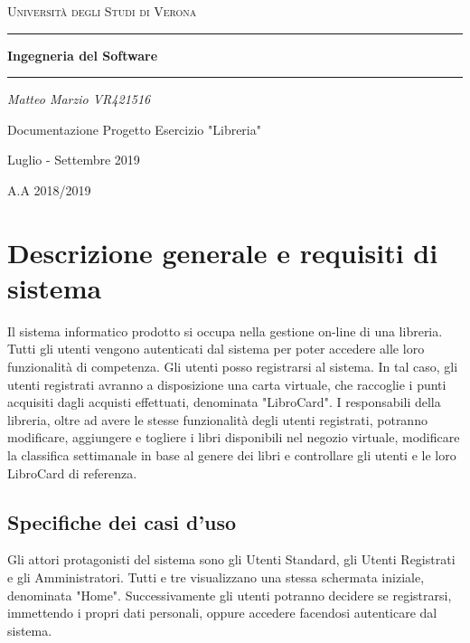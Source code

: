 \documentclass[a4paper, 10pt]{article}
\begin{document}
	\clearpage
	
	\begin{titlepage}
		\centering
		\vspace{\fill}
		{\scshape\LARGE Università degli Studi di Verona \par}
		\vspace{2cm} 
		
		\hrule
		\vspace{0.5cm}
		{\huge\bfseries Ingegneria del Software \par}
		\vspace{0.5cm}
		\hrule
		\vspace{1.5cm}
		
		{\LARGE\itshape Matteo Marzio VR421516 \par}
		\vspace{1.0cm}
		Documentazione Progetto Esercizio "Libreria" \par
		\vspace{1.0cm}
		Luglio - Settembre 2019 \par
		A.A 2018/2019\par

		\vspace{\fill}
	\end{titlepage}
	\tableofcontents
	\newpage
	\section{Descrizione generale e requisiti di sistema}
	Il sistema informatico prodotto si occupa nella gestione on-line di una libreria. 
	Tutti gli utenti vengono autenticati dal sistema per poter accedere alle loro funzionalità di
    competenza. Gli utenti posso registrarsi al sistema. In tal caso, gli utenti registrati avranno a
    disposizione una carta virtuale, che raccoglie i punti acquisiti dagli acquisti effettuati,
    denominata "LibroCard". I responsabili della libreria, oltre ad avere le stesse funzionalità 
    degli utenti registrati, potranno modificare, aggiungere e togliere i libri disponibili nel 
    negozio virtuale, modificare la classifica settimanale in base al genere dei libri e 
    controllare gli utenti e le loro LibroCard di referenza.
	\subsection{Specifiche dei casi d'uso}
		Gli attori protagonisti del sistema sono gli Utenti Standard, gli Utenti 
		Registrati e gli Amministratori. Tutti e tre visualizzano una stessa schermata 
		iniziale, denominata "Home". Successivamente gli utenti potranno decidere se 
		registrarsi, immettendo i propri dati personali, oppure accedere facendosi autenticare 
		dal sistema.
\end{document}
